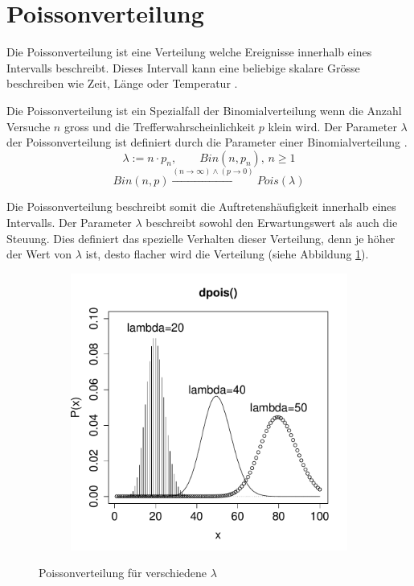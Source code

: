 \clearpage
\newpage
\section{Poissonverteilung}
Die Poissonverteilung ist eine Verteilung welche Ereignisse
innerhalb eines Intervalls beschreibt. Dieses Intervall kann
eine beliebige skalare Grösse beschreiben wie Zeit, Länge oder
Temperatur \parencite[307]{oreilly}.

Die Poissonverteilung ist ein Spezialfall der Binomialverteilung
wenn die Anzahl Versuche $n$ gross und die 
Trefferwahrscheinlichkeit $p$ klein wird. Der Parameter $\lambda$
der Poissonverteilung ist definiert durch die Parameter einer
Binomialverteilung \parencite[197]{henze}.
\[ 
	\lambda := n \cdot p_n, \qquad Bin(n, p_n),\,n\geq1
\]
\[ 
	Bin(n,p) \xrightarrow{
		(n \rightarrow \infty) 
		\land
		(p \rightarrow 0)}
	Pois(\lambda)
\]

\noindent
Die Poissonverteilung beschreibt somit die Auftretenshäufigkeit 
innerhalb eines Intervalls. Der Parameter $\lambda$ beschreibt
sowohl den Erwartungswert als auch die Steuung. Dies definiert
das spezielle Verhalten dieser Verteilung, denn je höher der
Wert von $\lambda$ ist, desto flacher wird die Verteilung 
(siehe Abbildung \ref{fig:poisfall}).



\begin{figure}[h!]
\centering
\begin{subfigure}[b]{0.48\textwidth}
\includegraphics{verteilungen-028}
\end{subfigure}
\caption{Poissonverteilung für verschiedene $\lambda$}
\label{fig:poisfall}
\end{figure}

